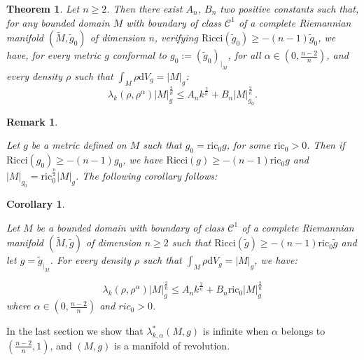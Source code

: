 \documentclass[12pt,reqno]{amsart}		%
\theoremstyle{plain}
\newtheorem{theorem}{Theorem}%
\newtheorem{corollary}[thm]{Corollary}
\newtheorem{remark}[thm]{Remark}
\theoremstyle{definition}
\theoremstyle{remark}
\numberwithin{equation}{section}
\renewcommand{\d}{\mathrm{d}}
\begin{document}
\begin{theorem}
\label{thm_borne_sup}
Let $n \geqslant 2$. Then there exist $A_n$, $B_n$ two positive constants such that, for any bounded domain $M$ with boundary of class $\mathscr{C}^{1}$ of a complete Riemannian manifold $(\tilde{M},\tilde{g}_{0})$ of dimension $n$, verifying $\text{Ricci}(\tilde{g}_{0})\geqslant -(n-1)\tilde{g}_{0}$, we have, for every metric $g$ conformal to $g_{0}:=\left(\tilde{g}_{0}\right)_{|_{M}}$, for all $\alpha \in \left(0,\frac{n-2}{n}\right)$, and every density $\rho$ such that $\int_{M}\rho \d V_{g}=|M|_{g}$:
\begin{equation*}
	\lambda_{k}(\rho,\rho^{\alpha})|M|_{g}^{\frac{2}{n}}\leqslant A_{n}k^{\frac{2}{n}}+B_{n}|M|_{g_{0}}^{\frac{2}{n}}.
\end{equation*}
\end{theorem}

\begin{remark}\ %

Let $g$ be a metric defined on $M$ such that $g_0 = \text{ric}_0 g$, for some $\text{ric}_0 > 0$. Then if $\text{Ricci}\left(g_0\right) \geqslant -(n-1)g_0$, we have $\text{Ricci}(g) \geqslant -(n-1)\text{ric}_0 g$ and $|M|_{g_0} = \text{ric}_0^{\frac{n}{2}}|M|_g$. The following corollary follows:
\end{remark}




\begin{corollary}\ %
\label{corollaire_thm_borne_sup}

Let $M$ be a bounded domain with boundary of class $\mathscr{C}^{1}$ of a complete Riemannian manifold $(\tilde{M},\tilde{g})$ of dimension $n\geqslant 2$ such that $\text{Ricci}(\tilde{g})\geqslant -(n-1)\text{ric}_0 \tilde{g}$ and let $g=\tilde{g}_{|_{M}}$. For every density $\rho$ such that $\int_{M}\rho \d V_{g}=|M|_{g}$, we have:

\begin{equation*}
	\lambda_{k}(\rho,\rho^{\alpha})|M|_{g}^{\frac{2}{n}}\leqslant A_{n}k^{\frac{2}{n}}+B_{n}\text{ric}_0|M|_{g}^{\frac{2}{n}}
\end{equation*}
where $\alpha\in \left(0,\frac{n-2}{n}\right)$ and $ric_0 > 0$.

\end{corollary}



In the last section we show that $\lambda^{*}_{k,\alpha}(M,g)$ is infinite when $\alpha$ belongs to $\left(\frac{n-2}{n},1\right)$, and $(M,g)$ is a manifold of revolution.
\end{document}
